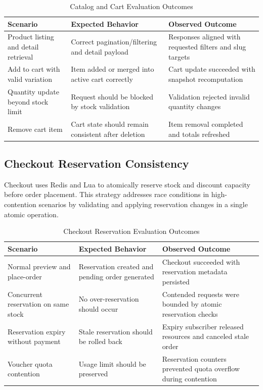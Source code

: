 \begin{table}[H]
\centering
\caption{Catalog and Cart Evaluation Outcomes}
\label{tab:discussion-cart-outcomes}
\begin{tabular}{|p{3.4cm}|p{4.2cm}|p{4.4cm}|}
\hline
\textbf{Scenario} & \textbf{Expected Behavior} & \textbf{Observed Outcome} \\
\hline
Product listing and detail retrieval & Correct pagination/filtering and detail payload & Responses aligned with requested filters and slug targets \\
\hline
Add to cart with valid variation & Item added or merged into active cart correctly & Cart update succeeded with snapshot recomputation \\
\hline
Quantity update beyond stock limit & Request should be blocked by stock validation & Validation rejected invalid quantity changes \\
\hline
Remove cart item & Cart state should remain consistent after deletion & Item removal completed and totals refreshed \\
\hline
\end{tabular}
\end{table}

\subsection{Checkout Reservation Consistency}

Checkout uses Redis and Lua to atomically reserve stock and discount capacity before order placement. This strategy addresses race conditions in high-contention scenarios by validating and applying reservation changes in a single atomic operation.

\begin{table}[H]
\centering
\caption{Checkout Reservation Evaluation Outcomes}
\label{tab:discussion-checkout-outcomes}
\begin{tabular}{|p{3.4cm}|p{4.2cm}|p{4.4cm}|}
\hline
\textbf{Scenario} & \textbf{Expected Behavior} & \textbf{Observed Outcome} \\
\hline
Normal preview and place-order & Reservation created and pending order generated & Checkout succeeded with reservation metadata persisted \\
\hline
Concurrent reservation on same stock & No over-reservation should occur & Contended requests were bounded by atomic reservation checks \\
\hline
Reservation expiry without payment & Stale reservation should be rolled back & Expiry subscriber released resources and canceled stale order \\
\hline
Voucher quota contention & Usage limit should be preserved & Reservation counters prevented quota overflow during contention \\
\hline
\end{tabular}
\end{table}

